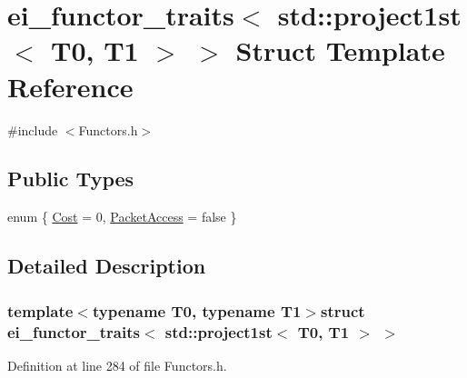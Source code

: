 \hypertarget{structei__functor__traits_3_01std_1_1project1st_3_01_t0_00_01_t1_01_4_01_4}{\section{ei\-\_\-functor\-\_\-traits$<$ std\-:\-:project1st$<$ T0, T1 $>$ $>$ Struct Template Reference}
\label{structei__functor__traits_3_01std_1_1project1st_3_01_t0_00_01_t1_01_4_01_4}
}


{\ttfamily \#include $<$Functors.\-h$>$}

\subsection*{Public Types}
\begin{DoxyCompactItemize}
\item 
enum \{ \hyperlink{structei__functor__traits_3_01std_1_1project1st_3_01_t0_00_01_t1_01_4_01_4_a6c5bfec6710b8247140981e45c9968a8a0c01721de3d32b354e8601f81aebd626}{Cost} = 0, 
\hyperlink{structei__functor__traits_3_01std_1_1project1st_3_01_t0_00_01_t1_01_4_01_4_a6c5bfec6710b8247140981e45c9968a8a0237ba742ccd71586956697bfd5ad7ac}{Packet\-Access} = false
 \}
\end{DoxyCompactItemize}


\subsection{Detailed Description}
\subsubsection*{template$<$typename T0, typename T1$>$struct ei\-\_\-functor\-\_\-traits$<$ std\-::project1st$<$ T0, T1 $>$ $>$}



Definition at line 284 of file Functors.\-h.



